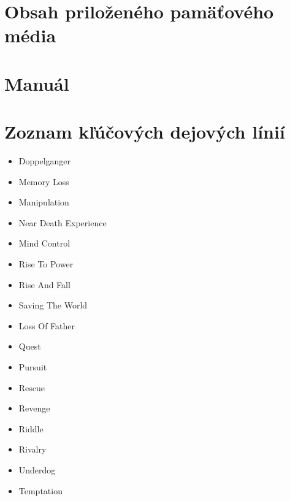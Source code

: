 \chapter{Obsah priloženého pamäťového média}

\chapter{Manuál}


\chapter{Zoznam kľúčových dejových línií} \label{priloha-kdl}

\begin{minipage}[t]{.5\textwidth}
    \begin{itemize}
        \item Doppelganger 
        \item Memory Loss
        \item Manipulation
        \item Near Death Experience
        \item Mind Control
        \item Rise To Power
        \item Rise And Fall
        \item Saving The World
        \item Loss Of Father
        \item Quest
        \item Pursuit
        \item Rescue
        \item Revenge
        \item Riddle
        \item Rivalry
        \item Underdog
        \item Temptation
        
    \end{itemize}   
\end{minipage}%
